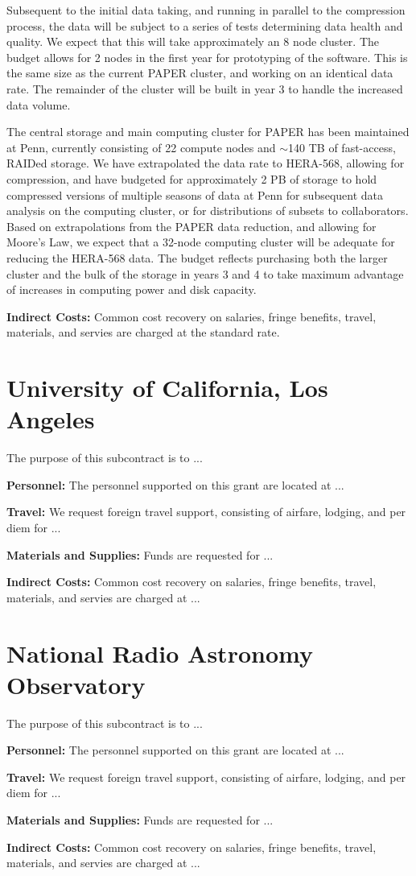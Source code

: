 \documentclass[onecolumn,11pt]{aastex}
\begin{document}
  Subsequent to the initial data taking, and running in parallel to the compression process, the data will be subject to a series of tests determining data health and quality.  We expect that this will take approximately an 8 node cluster.  The budget allows for 2 nodes in the first year for prototyping of the software.  This is the same size as the current PAPER cluster, and working on an identical data rate.  The remainder of the cluster will be built in year 3 to handle the increased data volume.

 The central storage and main computing cluster for PAPER has been maintained at Penn, currently consisting of 22 compute nodes and $\sim$140 TB of fast-access, RAIDed storage.  We have extrapolated the data rate to HERA-568, allowing for compression, and have budgeted for approximately 2 PB of storage to hold compressed versions of multiple seasons of data at Penn for subsequent data analysis on the computing cluster, or for distributions of subsets to collaborators.  Based on extrapolations from the PAPER data reduction, and allowing for Moore's Law, we expect that a 32-node computing cluster will be adequate for reducing the HERA-568 data.  The budget reflects purchasing both the larger cluster and the bulk of the storage in years 3 and 4 to take maximum advantage of increases in computing power and disk capacity.

{\bf Indirect Costs:}
Common cost recovery on salaries, fringe benefits, travel, materials, and servies are charged at the standard rate.

\section{University of California, Los Angeles}
The purpose of this subcontract is to ...

{\bf Personnel:} 
The personnel supported on this grant are located at ...

{\bf Travel:} We request foreign travel support, consisting of airfare, lodging,
and per diem for ...

{\bf Materials and Supplies:}  Funds are requested for ... 

{\bf Indirect Costs:}
Common cost recovery on salaries, fringe benefits, travel, materials, and servies are
charged at ...



\section{National Radio Astronomy Observatory}
The purpose of this subcontract is to ...

{\bf Personnel:} 
The personnel supported on this grant are located at ...

{\bf Travel:} We request foreign travel support, consisting of airfare, lodging,
and per diem for ...

{\bf Materials and Supplies:}  Funds are requested for ... 

{\bf Indirect Costs:}
Common cost recovery on salaries, fringe benefits, travel, materials, and servies are
charged at ...
\end{document}

